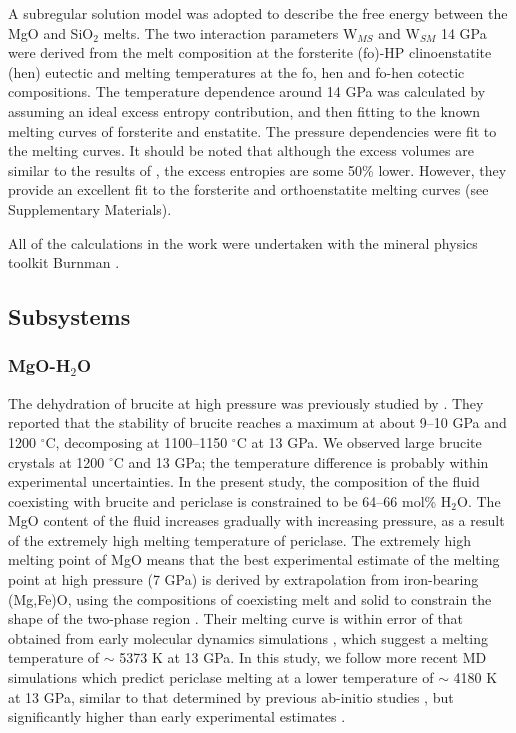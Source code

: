 \documentclass[review]{elsarticle}
\begin{document}
A subregular solution model was adopted to describe the free energy between the MgO and SiO$_2$ melts. The two interaction parameters W$_{MS}$ and W$_{SM}$ 14 GPa were derived from the melt composition at the forsterite (fo)-HP clinoenstatite (hen) eutectic \citep{} and melting temperatures at the fo, hen and fo-hen cotectic compositions. The temperature dependence around 14 GPa was calculated by assuming an ideal excess entropy contribution, and then fitting to the known melting curves of forsterite and enstatite. The pressure dependencies were fit to the melting curves. It should be noted that although the excess volumes are similar to the results of \cite{DKS2013}, the excess entropies are some 50\% lower. However, they provide an excellent fit to the forsterite and orthoenstatite melting curves (see Supplementary Materials).

All of the calculations in the work were undertaken with the mineral physics toolkit Burnman \cite{}.

\subsection{Subsystems}
\subsubsection{MgO-H$_2$O}
The dehydration of brucite at high pressure was previously studied by \cite{FIYKFO2005}. They reported that the stability of brucite reaches a maximum at about 9--10 GPa and 1200 $^{\circ}$C, decomposing at 1100--1150 $^{\circ}$C at 13 GPa. We observed large brucite crystals at 1200 $^{\circ}$C and 13 GPa; the temperature difference is probably within experimental uncertainties. In the present study, the composition of the fluid coexisting with brucite and periclase is constrained to be 64--66 mol\% H$_2$O. The MgO content of the fluid increases gradually with increasing pressure, as a result of the extremely high melting temperature of periclase. The extremely high melting point of MgO means that the best experimental estimate of the melting point at high pressure (7 GPa) is derived by extrapolation from iron-bearing (Mg,Fe)O, using the compositions of coexisting melt and solid to constrain the shape of the two-phase region \citep{ZF2008}. Their melting curve is within error of that obtained from early molecular dynamics simulations \citep{CG1994}, which suggest a melting temperature of $\sim$ 5373 K at 13 GPa. In this study, we follow more recent MD simulations \citep{KKS2013, DKS2013} which predict periclase melting at a lower temperature of $\sim$ 4180 K at 13 GPa, similar to that determined by previous ab-initio studies \citep{Alfe2005}, but significantly higher than early experimental estimates \citep[$\sim$ 3100 K][]{ZB1994}. 
\end{document}
